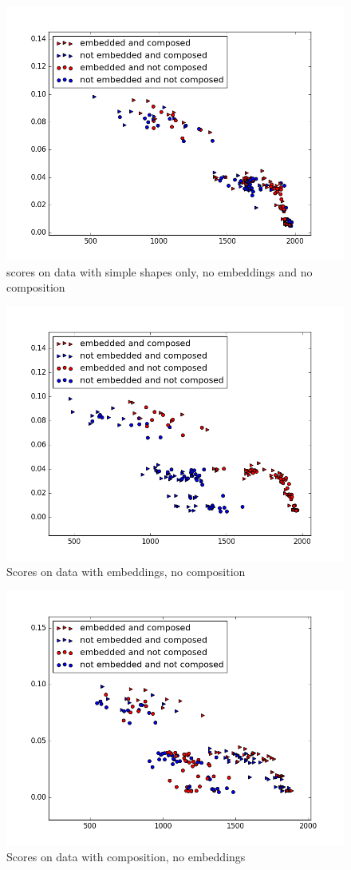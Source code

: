 \begin{description}
\begin{description}
\begin{figure}
\centering
\includegraphics[width=.8\linewidth]{ext/figure_simples_com.png}
\caption{scores on data with simple shapes only, no embeddings and no composition}
\label{fig:simples_com}
\end{figure}

\begin{figure}
\centering
\includegraphics[width=.8\linewidth]{ext/figure_embed_com.png}
\caption{Scores on data with embeddings, no composition}
\label{fig:embed_com}
\end{figure}


\begin{figure}
\centering
\includegraphics[width=.8\linewidth]{ext/figure_comp_com.png}
\caption{Scores on data with composition, no embeddings}
\label{fig:comp_com}
\end{figure}



\end{description}
\end{description}
